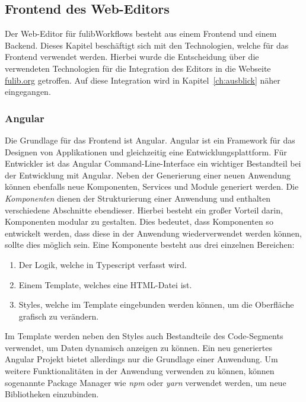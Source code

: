 \subsection{Frontend des Web-Editors}\label{subsec:fulibworkflows-web-editor}
Der Web-Editor für fulibWorkflows besteht aus einem Frontend und einem Backend.
Dieses Kapitel beschäftigt sich mit den Technologien, welche für das Frontend verwendet werden.
Hierbei wurde die Entscheidung über die verwendeten Technologien für die Integration des Editors in die Webseite \url{fulib.org} getroffen.
Auf diese Integration wird in Kapitel~\ref{ch:ausblick} näher eingegangen.

\subsubsection{Angular}
Die Grundlage für das Frontend ist Angular.
Angular ist ein Framework für das Designen von Applikationen und gleichzeitig eine Entwicklungsplattform\cite*{angular}.
Für Entwickler ist das Angular Command-Line-Interface ein wichtiger Bestandteil bei der Entwicklung mit Angular.
Neben der Generierung einer neuen Anwendung können ebenfalls neue Komponenten, Services und Module generiert werden.
Die \textit{Komponenten} dienen der Strukturierung einer Anwendung und enthalten verschiedene Abschnitte ebendieser.
Hierbei besteht ein großer Vorteil darin, Komponenten modular zu gestalten.
Dies bedeutet, dass Komponenten so entwickelt werden, dass diese in der Anwendung wiederverwendet werden können, sollte dies möglich sein.
Eine Komponente besteht aus drei einzelnen Bereichen:

\begin{enumerate}
    \item Der Logik, welche in Typescript verfasst wird.
    \item Einem Template, welches eine HTML-Datei ist.
    \item Styles, welche im Template eingebunden werden können, um die Oberfläche grafisch zu verändern.
\end{enumerate}

Im Template werden neben den Styles auch Bestandteile des Code-Segments verwendet, um Daten dynamisch anzeigen zu können.
Ein neu generiertes Angular Projekt bietet allerdings nur die Grundlage einer Anwendung.
Um weitere Funktionalitäten in der Anwendung verwenden zu können, können sogenannte Package Manager wie \textit{npm} oder \textit{yarn}
verwendet werden, um neue Bibliotheken einzubinden.

